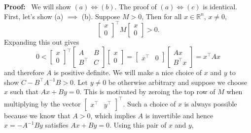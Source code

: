 \noindent \textbf{Proof:}~
	We will show $(a) \iff (b)$. The proof of $(a) \iff (c)$ is identical. First, let's show (a) $\implies$ (b).  Suppose $M>0$, Then for all $x \in \mathbb{R}^n$, $x\neq 0$,
		$$ \begin{bmatrix}  x \\ 0  \end{bmatrix} ^\top 	M  \begin{bmatrix}  x \\ 0  \end{bmatrix} > 0. $$
		Expanding this out gives
		$$ 0 < \begin{bmatrix}  x \\ 0 \end{bmatrix} ^\top \begin{bmatrix} A & B \\	B^\top & C	\end{bmatrix}
		    \begin{bmatrix}  x \\ 0 \end{bmatrix} = \begin{bmatrix} x^\top & 0 \end{bmatrix}
	        \begin{bmatrix}  Ax \\ B^\top x \end{bmatrix} = x^\top A x$$
and therefore $A$ is positive definite. We will make a nice choice of $x$ and $y$ to show $C-B^\top A^{-1} B > 0$. Let $y \neq 0$ be otherwise arbitrary and suppose we choose $x$ such that $Ax+By=0$. This is motivated by zeroing the top row of $M$ when multiplying by the vector $ \begin{bmatrix} x^\top & y^\top \end{bmatrix}^\top$. Such a choice of $x$ is always possible because we know that $A>0$, which implies $A$ is invertible and hence $x=- A^{-1} B y$ satisfies $Ax+By=0$. Using this pair of $x$ and $y$,
